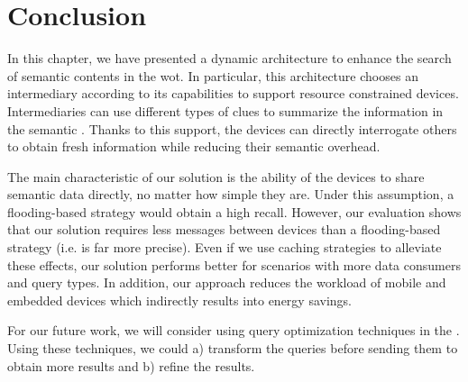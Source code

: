 \section{Conclusion}
\label{conclusion}

In this chapter, we have presented a dynamic architecture to enhance the search of semantic contents in the \acl{wot}.
In particular, this architecture chooses an intermediary according to its capabilities to support resource constrained devices.
Intermediaries can use different types of clues to summarize the information in the semantic \Space{}.
Thanks to this support, the devices can directly interrogate others to obtain fresh information while reducing their semantic overhead.

The main characteristic of our solution is the ability of the devices to share semantic data directly, no matter how simple they are. %
Under this assumption, a flooding-based strategy would obtain a high recall. %
However, our evaluation shows that our solution requires less messages between devices than a flooding-based strategy (i.e. is far more precise).
Even if we use caching strategies to alleviate these effects, our solution performs better for scenarios with more data consumers and query types.
In addition, our approach reduces the workload of mobile and embedded devices which indirectly results into energy savings.

For our future work, we will consider using query optimization techniques in the \providers{}.
Using these techniques, we could a) transform the queries before sending them to obtain more results
and b) refine the results.